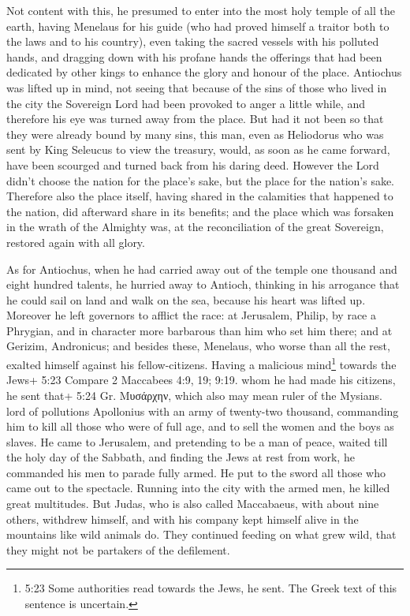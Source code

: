  Not content with this, he presumed to enter into the most
holy temple of all the earth, having Menelaus for his guide (who had
proved himself a traitor both to the laws and to his country),
 even taking the sacred vessels with his polluted hands,
and dragging down with his profane hands the offerings that had been
dedicated by other kings to enhance the glory and honour of the place.
 Antiochus was lifted up in mind, not seeing that because
of the sins of those who lived in the city the Sovereign Lord had been
provoked to anger a little while, and therefore his eye was turned away
from the place.  But had it not been so that they were
already bound by many sins, this man, even as Heliodorus who was sent by
King Seleucus to view the treasury, would, as soon as he came forward,
have been scourged and turned back from his daring deed. 
However the Lord didn't choose the nation for the place's sake, but the
place for the nation's sake.  Therefore also the place
itself, having shared in the calamities that happened to the nation, did
afterward share in its benefits; and the place which was forsaken in the
wrath of the Almighty was, at the reconciliation of the great Sovereign,
restored again with all glory.

 As for Antiochus, when he had carried away out of the
temple one thousand and eight hundred talents, he hurried away to
Antioch, thinking in his arrogance that he could sail on land and walk
on the sea, because his heart was lifted up.  Moreover he
left governors to afflict the race: at Jerusalem, Philip, by race a
Phrygian, and in character more barbarous than him who set him there;
 and at Gerizim, Andronicus; and besides these, Menelaus,
who worse than all the rest, exalted himself against his
fellow-citizens. Having a malicious mind\footnote{5:23 Some authorities
  read towards the Jews, he sent. The Greek text of this sentence is
  uncertain.} towards the Jews+ 5:23 Compare 2 Maccabees 4:9, 19; 9:19.
whom he had made his citizens,  he sent that+ 5:24 Gr.
Μυσάρχην, which also may mean ruler of the Mysians. lord of pollutions
Apollonius with an army of twenty-two thousand, commanding him to kill
all those who were of full age, and to sell the women and the boys as
slaves.  He came to Jerusalem, and pretending to be a man
of peace, waited till the holy day of the Sabbath, and finding the Jews
at rest from work, he commanded his men to parade fully armed.
 He put to the sword all those who came out to the
spectacle. Running into the city with the armed men, he killed great
multitudes.  But Judas, who is also called Maccabaeus, with
about nine others, withdrew himself, and with his company kept himself
alive in the mountains like wild animals do. They continued feeding on
what grew wild, that they might not be partakers of the defilement.

